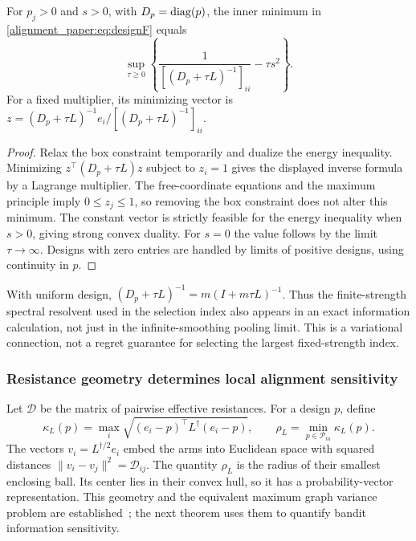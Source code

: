 \begin{lemma}
For $p_j>0$ and $s>0$, with $D_p=\operatorname{diag}(p)$, the inner minimum in \eqref{alignment_paper:eq:designF} equals
\begin{equation}
 \sup_{\tau\ge0}\left\{
 \frac{1}{[(D_p+\tau L)^{-1}]_{ii}}-\tau s^2\right\}.
 \label{alignment_paper:eq:resolventoracle}
\end{equation}
For a fixed multiplier, its minimizing vector is
$z=(D_p+\tau L)^{-1}e_i/[(D_p+\tau L)^{-1}]_{ii}$.
\label{alignment_paper:lem:resolvent}
\end{lemma}
\begin{proof}
Relax the box constraint temporarily and dualize the energy inequality. Minimizing $z^\top(D_p+\tau L)z$ subject to $z_i=1$ gives the displayed inverse formula by a Lagrange multiplier. The free-coordinate equations and the maximum principle imply $0\le z_j\le1$, so removing the box constraint does not alter this minimum. The constant vector is strictly feasible for the energy inequality when $s>0$, giving strong convex duality. For $s=0$ the value follows by the limit $\tau\to\infty$. Designs with zero entries are handled by limits of positive designs, using continuity in $p$.
\end{proof}
With uniform design, $(D_p+\tau L)^{-1}=m(I+m\tau L)^{-1}$. Thus the finite-strength spectral resolvent used in the selection index also appears in an exact information calculation, not just in the infinite-smoothing pooling limit. This is a variational connection, not a regret guarantee for selecting the largest fixed-strength index.

\subsubsection{Resistance geometry determines local alignment sensitivity}
Let $\mathcal D$ be the matrix of pairwise effective resistances. For a design $p$, define
\begin{equation}
 \kappa_L(p)=\max_i\sqrt{(e_i-p)^\top L^\dagger(e_i-p)},\qquad
 \rho_L=\min_{p\in\mathscr P_m}\kappa_L(p).
 \label{alignment_paper:eq:radiusdesign}
\end{equation}
The vectors $v_i=L^{\dagger/2}e_i$ embed the arms into Euclidean space with squared distances $\|v_i-v_j\|^2=\mathcal D_{ij}$. The quantity $\rho_L$ is the radius of their smallest enclosing ball. Its center lies in their convex hull, so it has a probability-vector representation. This geometry and the equivalent maximum graph variance problem are established~\cite{collected24}; the next theorem uses them to quantify bandit information sensitivity.

